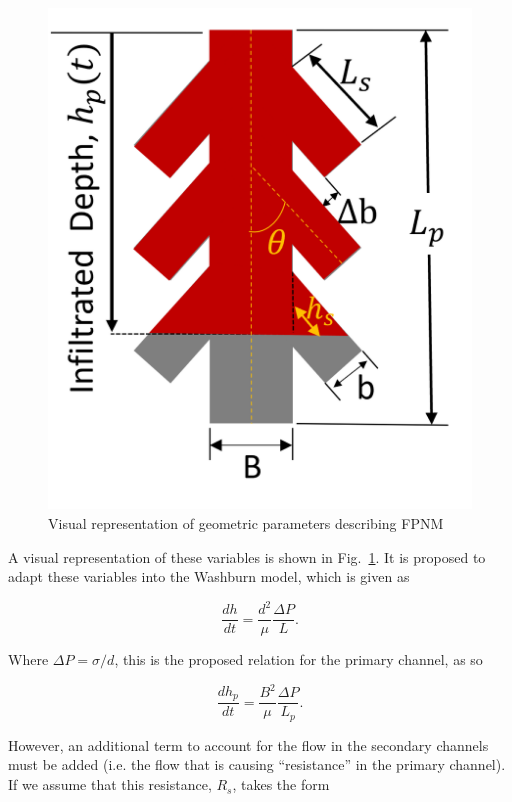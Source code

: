 \documentclass[%
 aip,
 amsmath,amssymb,
 reprint,%
]{revtex4-1}
\begin{document}
\begin{figure}
    \centering
    \includegraphics[width=\linewidth]{Figures/FPNM_cartoon.png}
    \caption{Visual representation of geometric parameters describing FPNM}
    \label{fig:FPNM_cartoon}
\end{figure}

\noindent A visual representation of these variables is shown in Fig.~\ref{fig:FPNM_cartoon}. It is proposed to adapt these variables into the Washburn model\cite{Washburn19213}, which is given as

\begin{equation}
    \frac{dh}{dt} = \frac{d^{2}}{\mu}\frac{\Delta P}{L}.
\end{equation}

\noindent Where $\Delta P = \sigma/d$, this is the proposed relation for the primary channel, as so

\begin{equation}
    \frac{dh_{p}}{dt} = \frac{B^{2}}{\mu}\frac{\Delta P}{L_{p}}.
\end{equation}

\noindent However, an additional term to account for the flow in the secondary channels must be added (i.e. the flow that is causing ``resistance'' in the primary channel). If we assume that this resistance, $R_{s}$, takes the form
\end{document}
